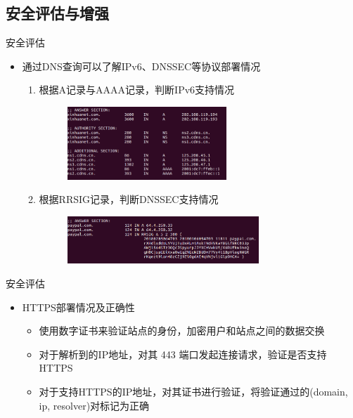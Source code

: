 \documentclass{beamer}
\begin{document}
\subsection{安全评估与增强}
\begin{frame}{安全评估}
  
  \begin{itemize}
    \item 通过DNS查询可以了解IPv6、DNSSEC等协议部署情况
    \begin{enumerate}
      \item 根据A记录与AAAA记录，判断IPv6支持情况
      \begin{figure}
        \includegraphics[height=2.74cm,width=6cm]{images/aaaa.png}
      \end{figure} 
  
      \item 根据RRSIG记录，判断DNSSEC支持情况
      \begin{figure}
        \includegraphics[height=1.79cm,width=7.21cm]{images/dnssec.png}
      \end{figure} 
    \end{enumerate}
  \end{itemize}
\end{frame}

\begin{frame}{安全评估}
  \begin{itemize}
    \item HTTPS部署情况及正确性
    \begin{itemize}
      \item 使用数字证书来验证站点的身份，加密用户和站点之间的数据交换
      \item 对于解析到的IP地址，对其 443 端口发起连接请求，验证是否支持HTTPS
      \item 对于支持HTTPS的IP地址，对其证书进行验证，将验证通过的(domain, ip, resolver)对标记为正确
    \end{itemize}
  \end{itemize}

\end{frame}
\end{document}
